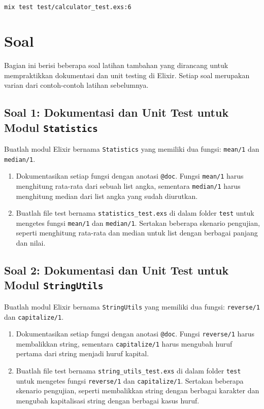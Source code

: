 \begin{lstlisting}[language=Bash]
	mix test test/calculator_test.exs:6
\end{lstlisting}


\section{Soal}

Bagian ini berisi beberapa soal latihan tambahan yang dirancang untuk mempraktikkan dokumentasi dan unit testing di Elixir. Setiap soal merupakan varian dari contoh-contoh latihan sebelumnya.

\subsection{Soal 1: Dokumentasi dan Unit Test untuk Modul \texttt{Statistics}}

Buatlah modul Elixir bernama \texttt{Statistics} yang memiliki dua fungsi: \texttt{mean/1} dan \texttt{median/1}. 

\begin{enumerate}
	\item Dokumentasikan setiap fungsi dengan anotasi \texttt{@doc}. Fungsi \texttt{mean/1} harus menghitung rata-rata dari sebuah list angka, sementara \texttt{median/1} harus menghitung median dari list angka yang sudah diurutkan.
	\item Buatlah file test bernama \texttt{statistics\_test.exs} di dalam folder \texttt{test} untuk mengetes fungsi \texttt{mean/1} dan \texttt{median/1}. Sertakan beberapa skenario pengujian, seperti menghitung rata-rata dan median untuk list dengan berbagai panjang dan nilai.
\end{enumerate}

\subsection{Soal 2: Dokumentasi dan Unit Test untuk Modul \texttt{StringUtils}}

Buatlah modul Elixir bernama \texttt{StringUtils} yang memiliki dua fungsi: \texttt{reverse/1} dan \texttt{capitalize/1}. 

\begin{enumerate}
	\item Dokumentasikan setiap fungsi dengan anotasi \texttt{@doc}. Fungsi \texttt{reverse/1} harus membalikkan string, sementara \texttt{capitalize/1} harus mengubah huruf pertama dari string menjadi huruf kapital.
	\item Buatlah file test bernama \texttt{string\_utils\_test.exs} di dalam folder \texttt{test} untuk mengetes fungsi \texttt{reverse/1} dan \texttt{capitalize/1}. Sertakan beberapa skenario pengujian, seperti membalikkan string dengan berbagai karakter dan mengubah kapitalisasi string dengan berbagai kasus huruf.
\end{enumerate}



